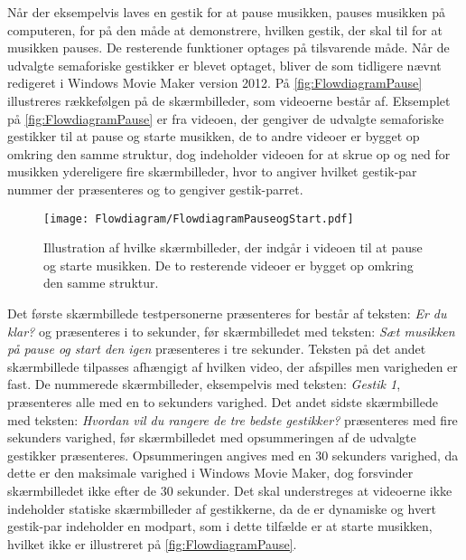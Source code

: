 Når der eksempelvis laves en gestik for at pause musikken, pauses musikken på computeren, for på den måde at demonstrere, hvilken gestik, der skal til for at musikken pauses. De resterende funktioner optages på tilsvarende måde.\blankline
%
Når de udvalgte semaforiske gestikker er blevet optaget, bliver de som tidligere nævnt redigeret i Windows Movie Maker version 2012. På \autoref{fig:FlowdiagramPause} illustreres rækkefølgen på de skærmbilleder, som videoerne består af. Eksemplet på \autoref{fig:FlowdiagramPause} er fra videoen, der gengiver de udvalgte semaforiske gestikker til at pause og starte musikken, de to andre videoer er bygget op omkring den samme struktur, dog indeholder videoen for at skrue op og ned for musikken ydereligere fire skærmbilleder, hvor to angiver hvilket gestik-par nummer der præsenteres og to gengiver gestik-parret.       
%
\begin{figure}[H]
	\centering
	\texttt{[image: Flowdiagram/FlowdiagramPauseogStart.pdf]}
	\caption{Illustration af hvilke skærmbilleder, der indgår i videoen til at pause og starte musikken. De to resterende videoer er bygget op omkring den samme struktur.}
	\label{fig:FlowdiagramPause}
\end{figure}
\noindent
%
Det første skærmbillede testpersonerne præsenteres for består af teksten: \textit{Er du klar?} og præsenteres i to sekunder, før skærmbilledet med teksten: \textit{Sæt musikken på pause og start den igen} præsenteres i tre sekunder. Teksten på det andet skærmbillede tilpasses afhængigt af hvilken video, der afspilles men varigheden er fast. De nummerede skærmbilleder, eksempelvis med teksten: \textit{Gestik 1}, præsenteres alle med en to sekunders varighed. Det andet sidste skærmbillede med teksten: \textit{Hvordan vil du rangere de tre bedste gestikker?} præsenteres med fire sekunders varighed, før skærmbilledet med opsummeringen af de udvalgte gestikker præsenteres. Opsummeringen angives med en 30 sekunders varighed, da dette er den maksimale varighed i Windows Movie Maker, dog forsvinder skærmbilledet ikke efter de 30 sekunder. Det skal understreges at videoerne ikke indeholder statiske skærmbilleder af gestikkerne, da de er dynamiske og hvert gestik-par indeholder en modpart, som i dette tilfælde er at starte musikken, hvilket ikke er illustreret på \autoref{fig:FlowdiagramPause}.

